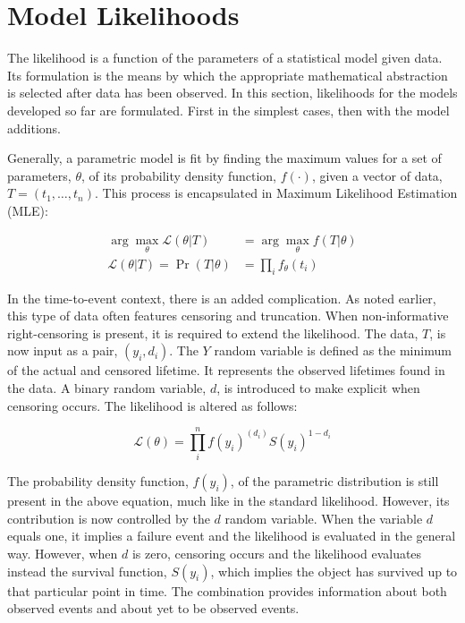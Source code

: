 \section*{Model Likelihoods}

The likelihood is a function of the parameters of a statistical model given data. Its formulation is the means by which the appropriate mathematical abstraction is selected after data has been observed. In this section, likelihoods for the models developed so far are formulated. First in the simplest cases, then with the model additions.

Generally, a parametric model is fit by finding the maximum values for a set of parameters, $\theta$, of its probability density function, $f(\cdot)$, given a vector of data, $T = (t_1, \dots, t_n)$. This process is encapsulated in Maximum Likelihood Estimation (MLE):

\begin{align*}
\displaystyle \arg \max _{\theta }{\mathcal {L}}(\theta | T) &= \arg \max _{\theta }f(T|\theta ) \\
{\mathcal {L}}(\theta | T) = \Pr(T | \theta) &= \prod_i f_{\theta}(t_i)
\end{align*}

In the time-to-event context, there is an added complication. As noted earlier, this type of data often features censoring and truncation. When non-informative right-censoring is present, it is required to extend the likelihood. The data, $T$, is now input as a pair, $(y_i, d_i)$. The $Y$ random variable is defined as the minimum of the actual and censored lifetime. It represents the observed lifetimes found in the data. A binary random variable, $d$, is introduced to make explicit when censoring occurs. The likelihood is altered as follows:

$$ \mathcal {L}(\theta) = \prod^n_i f(y_i)^{(d_i)} S(y_i)^{1 - d_i} $$

The probability density function, $f(y_i)$, of the parametric distribution is still present in the above equation, much like in the standard likelihood. However, its contribution is now controlled by the $d$ random variable. When the variable $d$ equals one, it implies a failure event and the likelihood is evaluated in the general way. However, when $d$ is zero,  censoring occurs and the likelihood evaluates instead the survival function, $S(y_i)$, which implies the object has survived up to that particular point in time. The combination provides information about both observed events and about yet to be observed events. 

